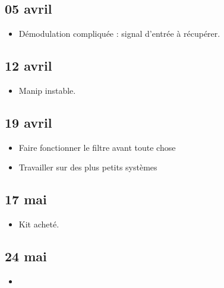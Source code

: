 \documentclass[a4paper, 11pt, final, garamond]{book}
\begin{document}
\subsection{05 avril}
\begin{itemize}
	\item Démodulation compliquée : signal d'entrée à récupérer.
\end{itemize}

\subsection{12 avril}
\begin{itemize}
	\item Manip instable.
\end{itemize}

\subsection{19 avril}
\begin{itemize}
	\item Faire fonctionner le filtre avant toute chose
	\item Travailler sur des plus petits systèmes
\end{itemize}

\subsection{17 mai}
\begin{itemize}
	\item Kit acheté.
\end{itemize}

\subsection{24 mai}
\begin{itemize}
	\item
\end{itemize}
\end{document}
